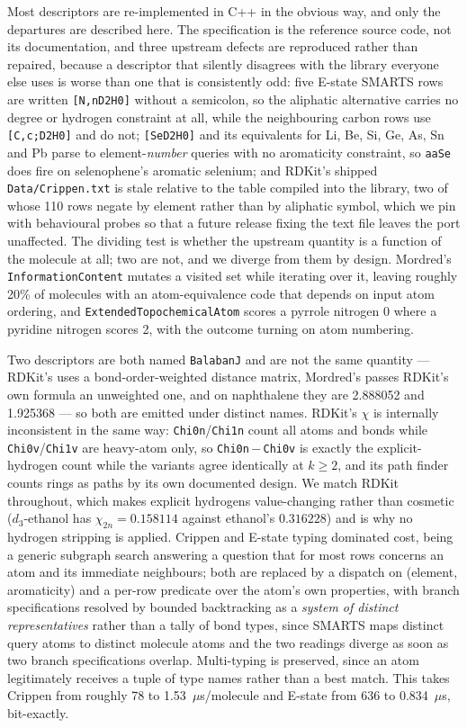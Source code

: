 Most descriptors are re-implemented in C++ in the obvious way, and only the departures are
described here. The specification is the reference source code, not its documentation, and three
upstream defects are reproduced rather than repaired, because a descriptor that silently
disagrees with the library everyone else uses is worse than one that is consistently odd: five
E-state SMARTS rows are written \texttt{[N,nD2H0]} without a semicolon, so the aliphatic
alternative carries no degree or hydrogen constraint at all, while the neighbouring carbon rows
use \texttt{[C,c;D2H0]} and do not; \texttt{[SeD2H0]} and its equivalents for Li, Be, Si, Ge, As,
Sn and Pb parse to element-\emph{number} queries with no aromaticity constraint, so
\texttt{aaSe} does fire on selenophene's aromatic selenium; and RDKit's shipped
\texttt{Data/Crippen.txt} is stale relative to the table compiled into the library, two of whose
110 rows negate by element rather than by aliphatic symbol, which we pin with behavioural probes
so that a future release fixing the text file leaves the port unaffected. The dividing test is
whether the upstream quantity is a function of the molecule at all; two are not, and we diverge
from them by design. Mordred's \texttt{InformationContent} mutates a visited set while iterating
over it, leaving roughly 20\% of molecules with an atom-equivalence code that depends on input
atom ordering, and \texttt{ExtendedTopochemicalAtom} scores a pyrrole nitrogen 0 where a pyridine
nitrogen scores 2, with the outcome turning on atom numbering.

Two descriptors are both named \texttt{BalabanJ} and are not the same quantity --- RDKit's uses a
bond-order-weighted distance matrix, Mordred's passes RDKit's own formula an unweighted one, and
on naphthalene they are 2.888052 and 1.925368 --- so both are emitted under distinct names.
RDKit's $\chi$ is internally inconsistent in the same way: \texttt{Chi0n}/\texttt{Chi1n} count
all atoms and bonds while \texttt{Chi0v}/\texttt{Chi1v} are heavy-atom only, so
\texttt{Chi0n}\,$-$\,\texttt{Chi0v} is exactly the explicit-hydrogen count while the variants
agree identically at $k \geq 2$, and its path finder counts rings as paths by its own documented
design. We match RDKit throughout, which makes explicit hydrogens value-changing rather than
cosmetic ($d_3$-ethanol has $\chi_{2n} = 0.158114$ against ethanol's $0.316228$) and is why no
hydrogen stripping is applied. Crippen and E-state typing dominated cost, being a generic
subgraph search answering a question that for most rows concerns an atom and its immediate
neighbours; both are replaced by a dispatch on (element, aromaticity) and a per-row predicate
over the atom's own properties, with branch specifications resolved by bounded backtracking as a
\emph{system of distinct representatives} rather than a tally of bond types, since SMARTS maps
distinct query atoms to distinct molecule atoms and the two readings diverge as soon as two
branch specifications overlap. Multi-typing is preserved, since an atom legitimately receives a
tuple of type names rather than a best match. This takes Crippen from roughly 78 to
1.53~$\mu$s/molecule and E-state from 636 to 0.834~$\mu$s, bit-exactly.

